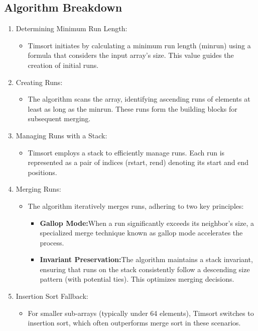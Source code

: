 \documentclass[a4paper, 9pt, twocolumn]{article}
\begin{document}
\subsection*{Algorithm Breakdown}
\begin{enumerate}
  \item Determining Minimum Run Length:\\
        \begin{itemize}
          \item Timsort initiates by calculating a minimum run length (minrun) using a formula that considers the input array's size. This value guides the creation of initial runs.
        \end{itemize}
  \item Creating Runs:
        \begin{itemize}
          \item The algorithm scans the array, identifying ascending runs of elements at least as long as the minrun. These runs form the building blocks for subsequent merging.
        \end{itemize}
  \item Managing Runs with a Stack:
        \begin{itemize}
          \item Timsort employs a stack to efficiently manage runs. Each run is represented as a pair of indices (rstart, rend) denoting its start and end positions.
        \end{itemize}
  \item Merging Runs:
        \begin{itemize}
          \item The algorithm iteratively merges runs, adhering to two key principles:
                \begin{itemize}
                  \item \textbf{Gallop Mode:}When a run significantly exceeds its neighbor's size, a specialized merge technique known as gallop mode accelerates the process.
                  \item \textbf{Invariant Preservation:}The algorithm maintains a stack invariant, ensuring that runs on the stack consistently follow a descending size pattern (with potential ties). This optimizes merging decisions.
                \end{itemize}
        \end{itemize}
  \item Insertion Sort Fallback:
        \begin{itemize}
          \item For smaller sub-arrays (typically under 64 elements), Timsort switches to insertion sort, which often outperforms merge sort in these scenarios.
        \end{itemize}
\end{enumerate}
\end{document}
